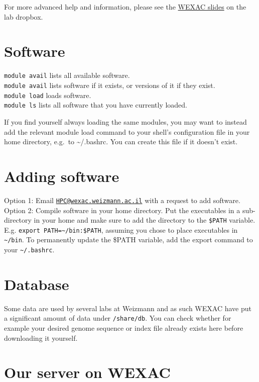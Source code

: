 \documentclass[]{book}
\begin{document}
For more advanced help and information, please see the
\href{https://www.dropbox.com/s/uuv6qrkrwlhytrm/wexac_introduction.pdf?dl=0}{WEXAC
slides} on the lab dropbox.

\section{Software}\label{software}

\texttt{module\ avail} lists all available software.\\
\texttt{module\ avail} lists software if it exists, or versions of it if
they exist.\\
\texttt{module\ load} loads software.\\
\texttt{module\ ls} lists all software that you have currently loaded.

If you find yourself always loading the same modules, you may want to
instead add the relevant module load command to your shell's
configuration file in your home directory, e.g.~to
\textasciitilde{}/.bashrc. You can create this file if it doesn't exist.

\section{Adding software}\label{adding-software}

Option 1: Email
\href{mailto:HPC@wexac.weizmann.ac.il}{\nolinkurl{HPC@wexac.weizmann.ac.il}}
with a request to add software.\\
Option 2: Compile software in your home directory. Put the executables
in a sub-directory in your home and make sure to add the directory to
the \texttt{\$PATH} variable. E.g.
\texttt{export\ PATH=\textasciitilde{}/bin:\$PATH}, assuming you chose
to place executables in \texttt{\textasciitilde{}/bin}. To permanently
update the \$PATH variable, add the export command to your
\texttt{\textasciitilde{}/.bashrc}.

\section{Database}\label{database}

Some data are used by several labs at Weizmann and as such WEXAC have
put a significant amount of data under \texttt{/share/db}. You can check
whether for example your desired genome sequence or index file already
exists here before downloading it yourself.

\section{Our server on WEXAC}\label{our-server-on-wexac}
\end{document}
